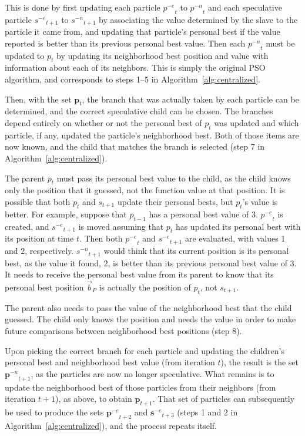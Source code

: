 \documentclass[journal,letterpaper]{IEEEtran}
\newcommand{\alg}[1]{Algorithm~\ref{alg:#1}}
\providecommand{\pbest}{\ensuremath{\Vec{b}_P}}
\providecommand{\noeval}[1]{\ensuremath{#1^{-e}}}
\providecommand{\nonbest}[1]{\ensuremath{#1^{-n}}}
\providecommand{\p}{\ensuremath{p}}
\providecommand{\pset}{\ensuremath{\mathbf{p}}}
\providecommand{\s}{\ensuremath{s}}
\providecommand{\sset}{\ensuremath{\mathbf{s}}}
\begin{document}
This is done by first updating each particle $\noeval{\p}_t$ to
$\nonbest{\p}_t$ and each speculative particle $\noeval{\s}_{t+1}$ to
$\nonbest{\s}_{t+1}$ by associating the value determined by the slave to the
particle it came from, and updating that particle's personal best if the value
reported is better than its previous personal best value.  Then each
$\nonbest{\p}_t$ must be updated to $\p_t$ by updating its neighborhood best
position and value with information about each of its neighbors.  This is
simply the original PSO algorithm, and corresponds to steps 1--5 in
\alg{centralized}.

Then, with the set $\pset_t$, the branch that was actually taken by each
particle can be determined, and the correct speculative child can be chosen.
The branches depend entirely on whether or not the personal best of $p_t$ was
updated and which particle, if any, updated the particle's neighborhood best.
Both of those items are now known, and the child that matches the branch is
selected (step 7 in \alg{centralized}).

The parent $\p_t$ must pass its personal best value to the child, as the child
knows only the position that it guessed, not the function value at that
position.  It is possible that both $\p_t$ and $\s_{t+1}$ update their
personal bests, but $\p_t$'s value is better.  For example, suppose that
$\p_{t-1}$ has a personal best value of 3.  $\noeval{\p}_t$ is created, and
$\noeval{\s}_{t+1}$ is moved assuming that $\p_t$ has updated its personal
best with its position at time $t$.  Then both $\noeval{\p}_t$ and
$\noeval{\s}_{t+1}$ are evaluated, with values 1 and 2, respectively.
$\nonbest{\s}_{t+1}$ would think that its current position is its personal
best, as the value it found, 2, is better than its previous personal best
value of 3.  It needs to receive the personal best value from its parent to
know that its personal best position $\pbest$ is actually the position of
$\p_t$, not $\s_{t+1}$.

The parent also needs to pass the value of the neighborhood best that the child
guessed.  The child only knows the position and needs the value in order to
make future comparisons between neighborhood best positions (step 8).

Upon picking the correct branch for each particle and updating the children's
personal best and neighborhood best value (from iteration $t$), the result is
the set $\nonbest{\pset}_{t+1}$, as the particles are now no longer
speculative.  What remains is to update the neighborhood best of those
particles from their neighbors (from iteration $t+1$), as above, to obtain
$\pset_{t+1}$.  That set of particles can subsequently be used to produce the
sets $\noeval{\pset}_{t+2}$ and $\noeval{\sset}_{t+3}$ (steps 1 and 2 in
\alg{centralized}), and the process repeats itself.
\end{document}
